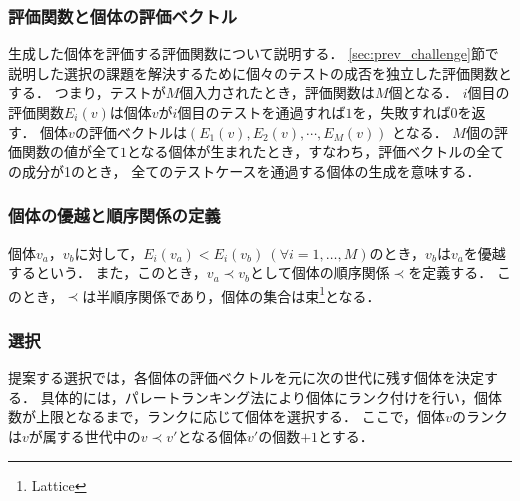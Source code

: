 \documentclass[uplatex,dvipdfmx,a4paper]{jsarticle}
\let\oldcite\cite
\renewcommand{\cite}[1]{\xspace\oldcite{#1}}
\begin{document}
\subsubsection{評価関数と個体の評価ベクトル} %
生成した個体を評価する評価関数について説明する．
\ref{sec:prev_challenge}節で説明した選択の課題を解決するために個々のテストの成否を独立した評価関数とする．
つまり，テストが$M$個入力されたとき，評価関数は$M$個となる．
$i$個目の評価関数$E_i(v)$は個体$v$が$i$個目のテストを通過すれば$1$を，失敗すれば$0$を返す．
個体$v$の評価ベクトルは$ (E_1(v), E_2(v), \cdots, E_M(v)) $ となる．
$M$個の評価関数の値が全て$1$となる個体が生まれたとき，すなわち，評価ベクトルの全ての成分が1のとき，
全てのテストケースを通過する個体の生成を意味する．

\subsubsection{個体の優越と順序関係の定義}
個体$v_a$，$v_b$に対して，$E_i(v_a) < E_i(v_b) ~(\forall i=1,\ldots,M)$のとき，$v_b$は$v_a$を優越するという．
また，このとき，$ v_a \prec v_b$として個体の順序関係$\prec$を定義する．
このとき，$\prec$は半順序関係であり，個体の集合は束\footnote{Lattice}となる．



\subsubsection{選択} \label{sec:prop_selection}
提案する選択では，各個体の評価ベクトルを元に次の世代に残す個体を決定する．
具体的には，パレートランキング法\cite{fonseca1993genetic}により個体にランク付けを行い，個体数が上限となるまで，ランクに応じて個体を選択する．
ここで，個体$v$のランクは$v$が属する世代中の$v \prec v'$となる個体$v'$の個数$+1$とする．
\end{document}
